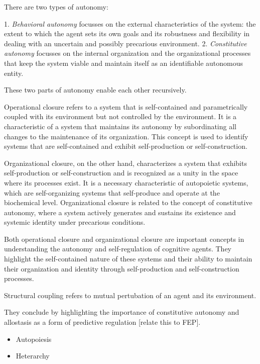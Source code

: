There are two types of autonomy:

1. \emph{Behavioral autonomy} focusses on the external characteristics of the system: the extent to which the agent sets its own goals and its robustness and flexibility in dealing with an uncertain and possibly precarious environment.
2. \emph{Constitutive autonomy} focusses on the internal organization and the organizational processes that keep the system viable and maintain itself as an identifiable autonomous entity.

These two parts of autonomy enable each other recursively.


Operational closure refers to a system that is self-contained and parametrically coupled with its environment but not controlled by the environment. It is a characteristic of a system that maintains its autonomy by subordinating all changes to the maintenance of its organization. This concept is used to identify systems that are self-contained and exhibit self-production or self-construction.

Organizational closure, on the other hand, characterizes a system that exhibits self-production or self-construction and is recognized as a unity in the space where its processes exist. It is a necessary characteristic of autopoietic systems, which are self-organizing systems that self-produce and operate at the biochemical level. Organizational closure is related to the concept of constitutive autonomy, where a system actively generates and sustains its existence and systemic identity under precarious conditions.

Both operational closure and organizational closure are important concepts in understanding the autonomy and self-regulation of cognitive agents. They highlight the self-contained nature of these systems and their ability to maintain their organization and identity through self-production and self-construction processes.

Structural coupling refers to mutual pertubation of an agent and its environment.

They conclude by highlighting the importance of constitutive autonomy and allostasis as a form of predictive regulation [relate this to FEP]. 


\begin{itemize}
    \item Autopoiesis
    \item Heterarchy
\end{itemize}

